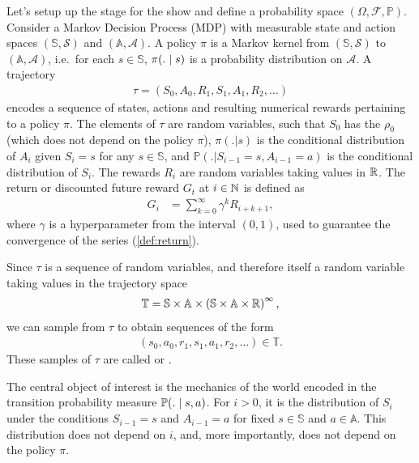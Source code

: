 \documentclass[a4paper,12pt]{amsart}
\newcommand{\stateSpace}{\mathbb S}
\newcommand{\stateSpaceAlg}{\mathcal S}
\newcommand{\actionSpace}{\mathbb A}
\newcommand{\actionSpaceAlg}{\mathcal A}
\newcommand{\policy}{\pi}
\newcommand{\discountFactor}{\gamma}
\newcommand{\prob}{\mathbb P}
\newcommand{\trajectory}{\tau}
\newcommand{\trajectorySpace}{\mathbb T}
\newcommand{\startStateDist}{\rho_0}
\begin{document}
Let's setup up the stage for the show and define a probability space
$\left( \Omega, \mathcal F, \prob \right)$.
Consider a Markov Decision Process (MDP) with measurable state and action spaces
$(\stateSpace, \stateSpaceAlg)$ and $(\actionSpace, \actionSpaceAlg)$.
A policy $\policy$ is a Markov kernel from $(\stateSpace, \stateSpaceAlg)$ to
$(\actionSpace, \actionSpaceAlg)$, i.e.\ for each $s\in\stateSpace$, 
$\policy(. \vb s)$ is a probability distribution on $\actionSpaceAlg$.
A trajectory
\begin{align*}
    \trajectory = \left( S_0, A_0, R_1, S_1, A_1, R_2, \ldots \right) 
\end{align*}
encodes a sequence of states, actions and resulting
numerical rewards pertaining to a policy $\policy$. The elements of $\tau$
are random variables, such that $S_{0}$ has the  
$\startStateDist$ (which does not depend on the policy $\pi$), 
$\policy(. | s)$ is the conditional distribution of $A_i$ given $S_i = s$ for
any $s\in\stateSpace$, and $\prob\left(. | S_{i-1}= s, A_{i-1}=a \right)$ is
the conditional distribution of $S_{i}$. The rewards $R_i$ are random
variables taking values in $\mathbb{R}$. The return or discounted future reward $G_t$
at $i\in\mathbb{N}$ is defined as
\begin{align}
    G_i &= \sum_{k=0}^{\infty} \discountFactor^{k} R_{i+k+1},
    \label{def:return}
\end{align}
where $\discountFactor$ is a hyperparameter from the interval $(0,1)$, used to guarantee
the convergence of the series (\ref{def:return}).

Since $\trajectory$ is a sequence of random variables, and therefore itself a random
variable taking values in the trajectory space 
\begin{align*}
    \trajectorySpace = \stateSpace\times\actionSpace\times 
        \left( \stateSpace\times\actionSpace\times\R \right)^{\infty},
\end{align*}
we can sample from $\trajectory$ to obtain sequences of the form
\begin{align*}
    \left( s_0, a_0, r_1, s_1, a_1, r_2,\ldots \right)\in\trajectorySpace.
\end{align*}
These samples of $\tau$ are called  or .

The central object of interest is the mechanics of the world encoded in the
transition probability measure $\prob(. \vb s, a)$. For $i>0$, it is the distribution of
$S_i$ under the conditions $S_{i-1} = s$ and $A_{i-1} = a$ for fixed
$s\in\stateSpace$ and $a\in\actionSpace$. This distribution does not depend on $i$, and,
more importantly, does not depend on the policy $\policy$. 
\end{document}
